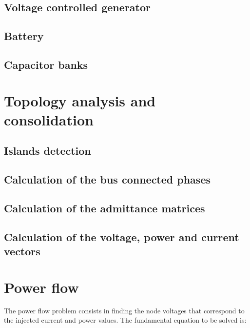 \documentclass{tufte-book}
\begin{document}
\section{Voltage controlled generator}


\section{Battery}


\section{Capacitor banks}




\chapter{Topology analysis and consolidation}


\section{Islands detection}


\section{Calculation of the bus connected phases}


\section{Calculation of the admittance matrices}


\section{Calculation of the voltage, power and current vectors}


\chapter{Power flow}

The power flow problem consists in finding the node voltages that correspond to the injected current and power values. The fundamental equation to be solved is:
\end{document}
